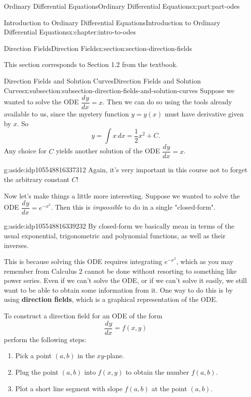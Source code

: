 \documentclass[twoside,10pt,]{book}
\newcommand{\terminology}[1]{\textbf{#1}}
\numberwithin{equation}{part}
\providecommand{\dv}[3][]{\dfrac{d^{#1} #2}{d #3^{#1}}}
\begin{document}
\begin{partptx}{Ordinary Differential Equations}{}{Ordinary Differential Equations}{}{}{x:part:part-odes}
\begin{chapterptx}{Introduction to Ordinary Differential Equations}{}{Introduction to Ordinary Differential Equations}{}{}{x:chapter:intro-to-odes}
\begin{sectionptx}{Direction Fields}{}{Direction Fields}{}{}{x:section:section-direction-fields}
\begin{introduction}{}
This section corresponds to Section 1.2 from the textbook.%
\end{introduction}%
%
%
\typeout{************************************************}
\typeout{************************************************}
%
\begin{subsectionptx}{Direction Fields and Solution Curves}{}{Direction Fields and Solution Curves}{}{}{x:subsection:subsection-direction-fields-and-solution-curves}
Suppose we wanted to solve the ODE \(\dv{y}{x} = x\). Then we can do so using the tools already available to us, since the mystery function \(y=y(x)\) must have derivative given by \(x\). So%
\begin{equation*}
y = \int x\,dx = \frac{1}{2}x^{2}+C.
\end{equation*}
Any choice for \(C\) yields another solution of the ODE \(\dv{y}{x} = x\).%
\begin{aside}{}{g:aside:idp105548816337312}%
Again, it's very important in this course not to forget the arbitrary constant \(C\)!%
\end{aside}
Now let's make things a little more interesting. Suppose we wanted to solve the ODE \(\dv{y}{x} = e^{-x^{2}}\). Then this is \emph{impossible} to do in a single "closed-form". \begin{aside}{}{g:aside:idp105548816339232}%
By closed-form we basically mean in terms of the usual exponential, trigonometric and polynomial functions, as well as their inverses.%
\end{aside}
 This is because solving this ODE requires integrating \(e^{-x^{2}}\), which as you may remember from Calculus 2 cannot be done without resorting to something like power series. Even if we can't solve the ODE, or if we can't solve it easily, we still want to be able to obtain some information from it. One way to do this is by using \terminology{direction fields}, which is a graphical representation of the ODE.%
\par
To construct a direction field for an ODE of the form%
\begin{equation*}
\dv{y}{x} = f(x,y)
\end{equation*}
perform the following steps:%
\begin{enumerate}
\item{}Pick a point \((a,b)\) in the \(xy\)-plane.%
\item{}Plug the point \((a,b)\) into \(f(x,y)\) to obtain the number \(f(a,b)\).%
\item{}Plot a short line segment with slope \(f(a,b)\) at the point \((a,b)\).%

\end{enumerate}
\end{subsectionptx}
\end{sectionptx}
\end{chapterptx}
\end{partptx}
\end{document}
